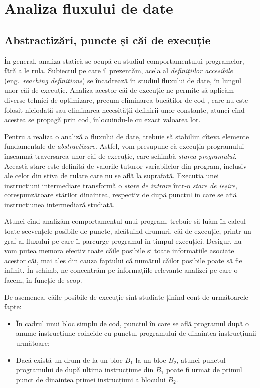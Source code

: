
\chapter{Analiza fluxului de date}
\label{ch:dataflow}

\section{Abstractizări, puncte și căi de execuție}
\label{sec:abstract}

În general, analiza statică se ocupă cu studiul comportamentului programelor,
fără a le rula. Subiectul pe care îl prezentăm, acela al \emph{definițiilor %
  accesibile} (eng.\ \textit{reaching definitions}) se încadrează în studiul
fluxului de date, în lungul unor căi de execuție. Analiza acestor căi de
execuție ne permite să aplicăm diverse tehnici de optimizare, precum
eliminarea bucăților de cod , care nu este folosit niciodată
sau eliminarea necesității definirii unor constante, atunci cînd acestea
se propagă prin cod, înlocuindu-le cu exact valoarea lor.

Pentru a realiza o analiză a fluxului de date, trebuie să stabilim cîteva
elemente fundamentale de \emph{abstractizare}. Astfel, vom presupune că
execuția programului în\-seam\-nă traversarea unor căi de execuție, care
schimbă \emph{starea programului}. Această stare este definită de valorile
tuturor variabilelor din program, inclusiv ale celor din stiva de rulare
care nu se află la suprafață. Execuția unei instrucțiuni intermediare
transformă o \emph{stare de intrare} într-o \emph{stare de ieșire},
corespunzătoare stărilor dinaintea, respectiv de după punctul în care
se află instrucțiunea intermediară studiată.

Atunci cînd analizăm comportamentul unui program, trebuie să luăm în
calcul toate secvențele posibile de puncte, alcătuind drumuri, căi de
execuție, printr-un graf al fluxului pe care îl parcurge programul în
timpul execuției. Desigur, nu vom putea memora efectiv toate căile posibile
și toate informațiile asociate acestor căi, mai ales din cauza faptului
că numărul căilor posibile poate să fie infinit. În schimb, ne concentrăm
pe informațiile relevante analizei pe care o facem, în funcție de scop.

De asemenea, căile posibile de execuție sînt studiate ținînd cont de
următoarele fapte:
\begin{itemize}
\item În cadrul unui bloc simplu de cod, punctul în care se află programul
  după o anume instrucțiune coincide cu punctul programului de dinaintea
  instrucțiunii următoare;
\item Dacă există un drum de la un bloc $ B_1 $ la un bloc $ B_2 $, atunci
  punctul programului de după ultima instrucțiune din $ B_1 $ poate fi
  urmat de primul punct de dinaintea primei instrucțiuni a blocului $ B_2 $.
\end{itemize}


